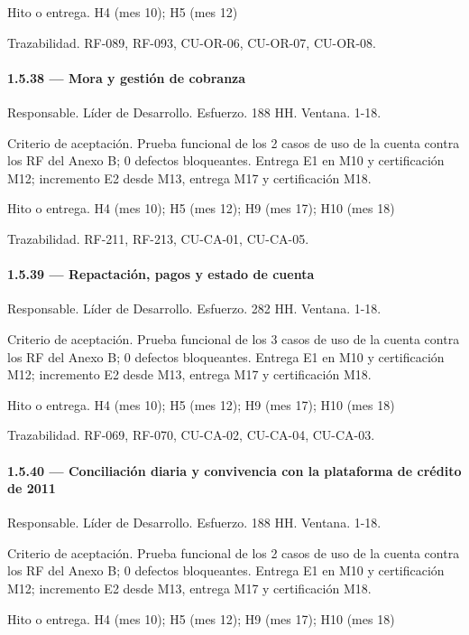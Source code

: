 \documentclass[11pt]{article}
\begin{document}
Hito o entrega. H4 (mes 10); H5 (mes 12)

Trazabilidad. RF-089, RF-093, CU-OR-06, CU-OR-07, CU-OR-08.

\paragraph{1.5.38 — Mora y gestión de cobranza}

Responsable. Líder de Desarrollo. Esfuerzo. 188 HH. Ventana. 1-18.

Criterio de aceptación. Prueba funcional de los 2 casos de uso de la cuenta contra los RF del Anexo B; 0 defectos bloqueantes. Entrega E1 en M10 y certificación M12; incremento E2 desde M13, entrega M17 y certificación M18.

Hito o entrega. H4 (mes 10); H5 (mes 12); H9 (mes 17); H10 (mes 18)

Trazabilidad. RF-211, RF-213, CU-CA-01, CU-CA-05.

\paragraph{1.5.39 — Repactación, pagos y estado de cuenta}

Responsable. Líder de Desarrollo. Esfuerzo. 282 HH. Ventana. 1-18.

Criterio de aceptación. Prueba funcional de los 3 casos de uso de la cuenta contra los RF del Anexo B; 0 defectos bloqueantes. Entrega E1 en M10 y certificación M12; incremento E2 desde M13, entrega M17 y certificación M18.

Hito o entrega. H4 (mes 10); H5 (mes 12); H9 (mes 17); H10 (mes 18)

Trazabilidad. RF-069, RF-070, CU-CA-02, CU-CA-04, CU-CA-03.

\paragraph{1.5.40 — Conciliación diaria y convivencia con la plataforma de crédito de 2011}

Responsable. Líder de Desarrollo. Esfuerzo. 188 HH. Ventana. 1-18.

Criterio de aceptación. Prueba funcional de los 2 casos de uso de la cuenta contra los RF del Anexo B; 0 defectos bloqueantes. Entrega E1 en M10 y certificación M12; incremento E2 desde M13, entrega M17 y certificación M18.

Hito o entrega. H4 (mes 10); H5 (mes 12); H9 (mes 17); H10 (mes 18)
\end{document}
